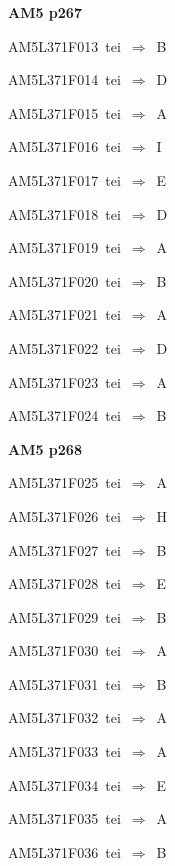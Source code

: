 \par\vfill\eject
{\bf\hfill AM5 p267\hfill\hbox{}}\par\bigskip
{\sixrm AM5L371F013\ {\sixit tei}\ }$\Rightarrow$\ B\par\smallskip
{\sixrm AM5L371F014\ {\sixit tei}\ }$\Rightarrow$\ D\par\smallskip
{\sixrm AM5L371F015\ {\sixit tei}\ }$\Rightarrow$\ A\par\smallskip
{\sixrm AM5L371F016\ {\sixit tei}\ }$\Rightarrow$\ I\par\smallskip
{\sixrm AM5L371F017\ {\sixit tei}\ }$\Rightarrow$\ E\par\smallskip
{\sixrm AM5L371F018\ {\sixit tei}\ }$\Rightarrow$\ D\par\smallskip
{\sixrm AM5L371F019\ {\sixit tei}\ }$\Rightarrow$\ A\par\smallskip
{\sixrm AM5L371F020\ {\sixit tei}\ }$\Rightarrow$\ B\par\smallskip
{\sixrm AM5L371F021\ {\sixit tei}\ }$\Rightarrow$\ A\par\smallskip
{\sixrm AM5L371F022\ {\sixit tei}\ }$\Rightarrow$\ D\par\smallskip
{\sixrm AM5L371F023\ {\sixit tei}\ }$\Rightarrow$\ A\par\smallskip
{\sixrm AM5L371F024\ {\sixit tei}\ }$\Rightarrow$\ B\par\smallskip

\par\vfill\eject
{\bf\hfill AM5 p268\hfill\hbox{}}\par\bigskip
{\sixrm AM5L371F025\ {\sixit tei}\ }$\Rightarrow$\ A\par\smallskip
{\sixrm AM5L371F026\ {\sixit tei}\ }$\Rightarrow$\ H\par\smallskip
{\sixrm AM5L371F027\ {\sixit tei}\ }$\Rightarrow$\ B\par\smallskip
{\sixrm AM5L371F028\ {\sixit tei}\ }$\Rightarrow$\ E\par\smallskip
{\sixrm AM5L371F029\ {\sixit tei}\ }$\Rightarrow$\ B\par\smallskip
{\sixrm AM5L371F030\ {\sixit tei}\ }$\Rightarrow$\ A\par\smallskip
{\sixrm AM5L371F031\ {\sixit tei}\ }$\Rightarrow$\ B\par\smallskip
{\sixrm AM5L371F032\ {\sixit tei}\ }$\Rightarrow$\ A\par\smallskip
{\sixrm AM5L371F033\ {\sixit tei}\ }$\Rightarrow$\ A\par\smallskip
{\sixrm AM5L371F034\ {\sixit tei}\ }$\Rightarrow$\ E\par\smallskip
{\sixrm AM5L371F035\ {\sixit tei}\ }$\Rightarrow$\ A\par\smallskip
{\sixrm AM5L371F036\ {\sixit tei}\ }$\Rightarrow$\ B\par\smallskip

